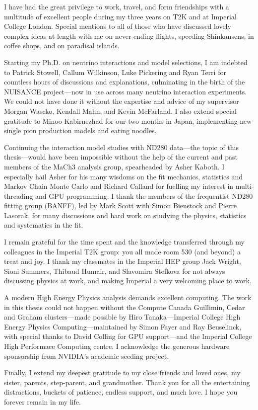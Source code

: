 \begin{acknowledgements}
	I have had the great privilege to work, travel, and form friendships with a multitude of excellent people during my three years on T2K and at Imperial College London. Special mentions to all of those who have discussed lovely complex ideas at length with me on never-ending flights, speeding Shinkansens, in coffee shops, and on paradisal islands.
	
	Starting my Ph.D. on neutrino interactions and model selections, I am indebted to Patrick Stowell, Callum Wilkinson, Luke Pickering and Ryan Terri for countless hours of discussions and explanations, culminating in the birth of the NUISANCE project\cite{NUISANCE}---now in use across many neutrino interaction experiments. We could not have done it without the expertise and advice of my supervisor Morgan Wascko, Kendall Mahn, and Kevin McFarland. I also extend special gratitude to Minoo Kabirnezhad for our two months in Japan, implementing new single pion production models and eating noodles.
  
	Continuing the interaction model studies with ND280 data---the topic of this thesis---would have been impossible without the help of the current and past members of the MaCh3 analysis group, spearheaded by Asher Kaboth. I especially hail Asher for his many wisdoms on the fit mechanics, statistics and Markov Chain Monte Carlo and Richard Calland for fuelling my interest in multi-threading and GPU programming. I thank the members of the frequentist ND280 fitting group (BANFF), led by Mark Scott with Simon Bienstock and Pierre Lasorak, for many discussions and hard work on studying the physics, statistics and systematics in the fit.
	
	I remain grateful for the time spent and the knowledge transferred through my colleagues in the Imperial T2K group: you all made room 530 (and beyond) a treat and joy. I thank my classmates in the Imperial HEP group Jack Wright, Sioni Summers, Thibaud Humair, and Slavomira Stefkova for not always discussing physics at work, and making Imperial a very welcoming place to work.
	
	A modern High Energy Physics analysis demands excellent computing. The work in this thesis could not happen without the Compute Canada Guillimin, Cedar and Graham clusters---made possible by Hiro Tanaka---Imperial College High Energy Physics Computing---maintained by Simon Fayer and Ray Beuselinck, with special thanks to David Colling for GPU support---and the Imperial College High Performace Computing centre. I acknowledge the generous hardware sponsorship from NVIDIA's academic seeding project.
	
	Finally, I extend my deepest gratitude to my close friends and loved ones, my sister, parents, step-parent, and grandmother. Thank you for all the entertaining distractions, buckets of patience, endless support, and much love. I hope you forever remain in my life.
\end{acknowledgements}

\tableofcontents